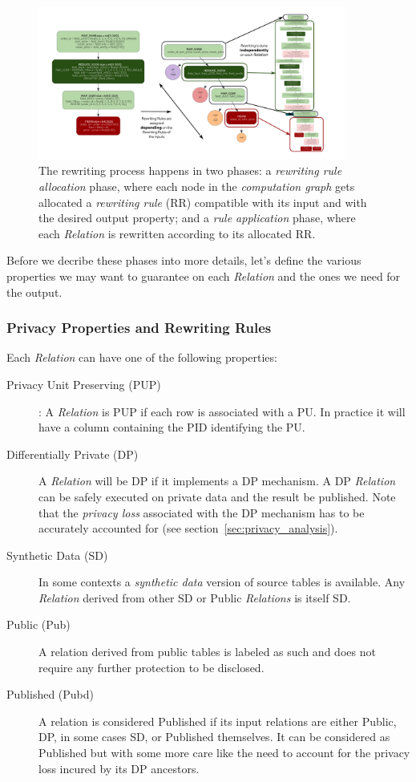 \documentclass[letterpaper]{article} %
\begin{document}
\begin{figure}[t]
    \centering
    \includegraphics[width=0.9\textwidth]{figures/rewriting} %
    \caption{The rewriting process happens in two phases: a \emph{rewriting rule allocation} phase, where each node in the \emph{computation graph} gets allocated a \emph{rewriting rule} (RR) compatible with its input and with the desired output property; and a \emph{rule application} phase, where each \emph{Relation} is rewritten according to its allocated RR.}
    \label{fig:rewriting}
\end{figure}

Before we decribe these phases into more details, let's define the various properties we may want to guarantee on each \emph{Relation} and the ones we need for the output.

\subsubsection{Privacy Properties and Rewriting Rules}
\label{sec:privacy_properties}

Each \emph{Relation} can have one of the following properties:
\begin{description}
    \item[Privacy Unit Preserving (PUP)]: A \emph{Relation} is PUP if each row is associated with a PU. In practice it will have a column containing the PID identifying the PU.
    \item[Differentially Private (DP)] A \emph{Relation} will be DP if it implements a DP mechanism. A DP \emph{Relation} can be safely  executed on private data and the result be published. Note that the \emph{privacy loss} associated with the DP mechanism has to be accurately accounted for (see section~\ref{sec:privacy_analysis}).
    \item[Synthetic Data (SD)] In some contexts a \emph{synthetic data} version of source tables is available. Any \emph{Relation} derived from other SD or Public \emph{Relations} is itself SD.
    \item[Public (Pub)] A relation derived from public tables is labeled as such and does not require any further protection to be disclosed.
    \item[Published (Pubd)] A relation is considered Published if its input relations are either Public, DP, in some cases SD, or Published themselves. It can be considered as Published but with some more care like the need to account for the privacy loss incured by its DP ancestors.
\end{description}
\end{document}
